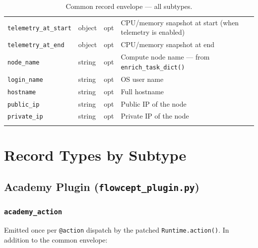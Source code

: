 \documentclass[11pt,a4paper]{article}
\newcommand{\opt}{\textcolor{optred}{opt}}
\newcommand{\subtype}[1]{\texttt{\textcolor{subtypeblue}{#1}}}
\begin{document}
\begin{longtable}{L{3.5cm} L{2.5cm} C{1.2cm} L{7cm}}
\texttt{telemetry\_at\_start}& object        & \opt  & CPU/memory snapshot at start (when telemetry is enabled) \\
\texttt{telemetry\_at\_end}  & object        & \opt  & CPU/memory snapshot at end \\
\texttt{node\_name}          & string        & \opt  & Compute node name — from \texttt{enrich\_task\_dict()} \\
\texttt{login\_name}         & string        & \opt  & OS user name \\
\texttt{hostname}            & string        & \opt  & Full hostname \\
\texttt{public\_ip}          & string        & \opt  & Public IP of the node \\
\texttt{private\_ip}         & string        & \opt  & Private IP of the node \\

\caption{Common record envelope — all subtypes.}
\label{tab:common}
\end{longtable}

\section{Record Types by Subtype}
\label{sec:subtypes}

\subsection{Academy Plugin (\texttt{flowcept\_plugin.py})}

\subsubsection{\subtype{academy\_action}}

Emitted once per \texttt{@action} dispatch by the patched
\texttt{Runtime.action()}. In addition to the common envelope:
\end{document}
